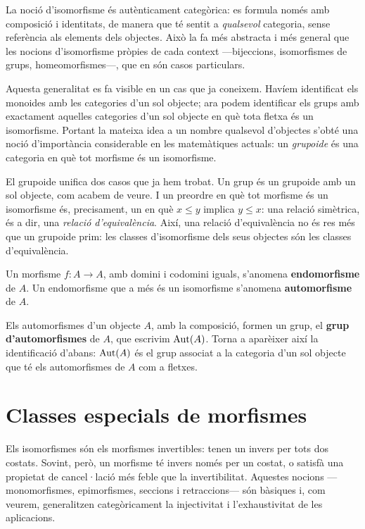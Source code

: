 \begin{observacio}
La noció d'isomorfisme és autènticament categòrica: es formula només amb composició i identitats, de manera que té sentit a \emph{qualsevol} categoria, sense referència als elements dels objectes. Això la fa més abstracta i més general que les nocions d'isomorfisme pròpies de cada context ---bijeccions, isomorfismes de grups, homeomorfismes---, que en són casos particulars.

Aquesta generalitat es fa visible en un cas que ja coneixem. Havíem identificat els monoides amb les categories d'un sol objecte; ara podem identificar els grups amb exactament aquelles categories d'un sol objecte en què tota fletxa és un isomorfisme. Portant la mateixa idea a un nombre qualsevol d'objectes s'obté una noció d'importància considerable en les matemàtiques actuals: un \emph{grupoide} és una categoria en què tot morfisme és un isomorfisme.

El grupoide unifica dos casos que ja hem trobat. Un grup és un grupoide amb un sol objecte, com acabem de veure. I un preordre en què tot morfisme és un isomorfisme és, precisament, un en què $x\le y$ implica $y\le x$: una relació simètrica, és a dir, una \emph{relació d'equivalència}. Així, una relació d'equivalència no és res més que un grupoide prim: les classes d'isomorfisme dels seus objectes són les classes d'equivalència.
\end{observacio}

\begin{definicio}
Un morfisme $f\colon A\to A$, amb domini i codomini iguals, s'anomena \textbf{endomorfisme} de $A$. Un endomorfisme que a més és un isomorfisme s'anomena \textbf{automorfisme} de $A$.
\end{definicio}

Els automorfismes d'un objecte $A$, amb la composició, formen un grup, el \textbf{grup d'automorfismes} de $A$, que escrivim $\operatorname{Aut}(A)$. Torna a aparèixer així la identificació d'abans: $\operatorname{Aut}(A)$ és el grup associat a la categoria d'un sol objecte que té els automorfismes de $A$ com a fletxes.

\section{Classes especials de morfismes}

Els isomorfismes són els morfismes invertibles: tenen un invers per tots dos costats. Sovint, però, un morfisme té invers només per un costat, o satisfà una propietat de cancel·lació més feble que la invertibilitat. Aquestes nocions ---monomorfismes, epimorfismes, seccions i retraccions--- són bàsiques i, com veurem, generalitzen categòricament la injectivitat i l'exhaustivitat de les aplicacions.

